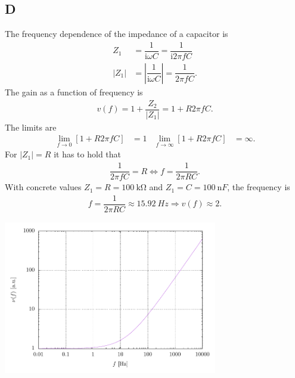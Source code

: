 \documentclass[a4paper,10pt]{article}
\newenvironment{Figure}
        {\par\medskip\noindent\minipage{\linewidth}}
        {\endminipage\par\medskip}
\numberwithin{equation}{section}
\begin{document}
\begin{multicols}{2}
        \subsection{D}
        The frequency dependence of the impedance of a capacitor is
        \begin{align} 
                Z_1 &= \dfrac{1}{\text{i}\omega C}=\dfrac{1}{\text{i}2\pi fC}\\
                |Z_1| &= \left|\dfrac{1}{\text{i}\omega C}\right| = \dfrac{1}{2\pi fC}
        .\end{align} 
        The gain as a function of frequency is
        \begin{align} 
                v\left(f\right)=1+\dfrac{Z_2}{|Z_1|}=1+R2\pi fC
        .\end{align} 
        The limits are
        \begin{align} 
                \lim_{f \rightarrow 0}\left[1+R2\pi fC\right] &= 1 & \lim_{f \rightarrow \infty}\left[1+R2\pi fC\right] &= \infty
        .\end{align} 
        For $|Z_1| = R$ it has to hold that
        \begin{align} 
                \dfrac{1}{2\pi fC}=R\Leftrightarrow f=\dfrac{1}{2\pi RC}
        .\end{align} 
        With concrete values $Z_1=R=\SI{100}{\kilo\ohm}$ and $Z_1=C=\SI{100}{\nano F}$, the frequency is
        \begin{align} 
                f=\dfrac{1}{2\pi RC}\approx \SI{15.92}{Hz}\Rightarrow v\left(f\right)\approx 2
        .\end{align} 
        \begin{Figure}
                \centering
                \includegraphics[width=0.7\textwidth]{../plot/preE_crop.pdf}
        \end{Figure}


\end{multicols}
\end{document}
